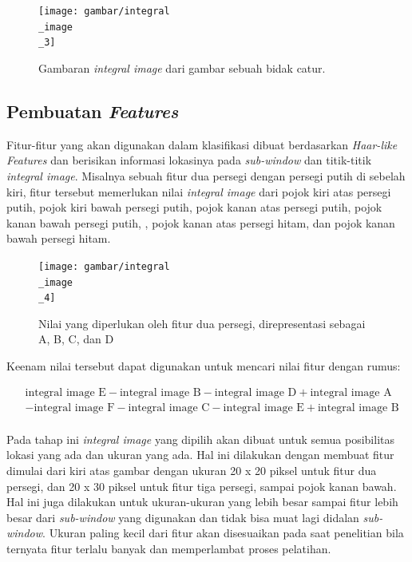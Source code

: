 \begin{figure}[H]
  \centering{}
	\texttt{[image: gambar/integral\\\_image\\\_3]}
  \caption{Gambaran \emph{integral image} dari gambar sebuah bidak catur.}
\end{figure}

\subsection{Pembuatan \textit{Features}}

Fitur-fitur yang akan digunakan dalam klasifikasi dibuat 
berdasarkan \emph{Haar-like Features} dan berisikan informasi 
lokasinya pada \emph{sub-window} dan titik-titik \emph{integral image}. 
Misalnya sebuah fitur dua persegi dengan persegi putih di 
sebelah kiri, fitur tersebut memerlukan 
nilai \emph{integral image} dari pojok kiri atas persegi putih, 
pojok kiri bawah persegi putih,  
pojok kanan atas persegi putih, 
pojok kanan bawah persegi putih, 
, pojok kanan atas persegi hitam, 
dan pojok kanan bawah persegi hitam. 
\begin{figure}[H]
  \centering{}
	\texttt{[image: gambar/integral\\\_image\\\_4]}
  \caption{Nilai yang diperlukan oleh fitur dua persegi, direpresentasi sebagai A, B, C, dan D}
\end{figure} 
Keenam nilai tersebut dapat digunakan untuk mencari nilai 
fitur dengan rumus:

\begin{equation}
  \begin{split}
    &\text{integral image E} - \text{integral image B} - \text{integral image D} + \text{integral image A} \\
    & - \text{integral image F} - \text{integral image C} - \text{integral image E} + \text{integral image B} \\    
  \end{split}
\end{equation}

Pada tahap ini \emph{integral image} yang dipilih akan dibuat untuk semua 
posibilitas lokasi yang ada dan ukuran yang ada. Hal ini dilakukan dengan 
membuat fitur dimulai dari kiri atas gambar dengan ukuran 20 x 20 piksel untuk fitur 
dua persegi, dan 20 x 30 piksel untuk fitur tiga persegi, sampai pojok kanan bawah. 
Hal ini juga dilakukan untuk ukuran-ukuran yang lebih besar sampai fitur lebih besar 
dari \emph{sub-window} yang digunakan dan tidak bisa muat lagi didalan \emph{sub-window}. 
Ukuran paling kecil dari fitur akan disesuaikan pada saat penelitian 
bila ternyata fitur terlalu banyak dan memperlambat proses pelatihan. 


